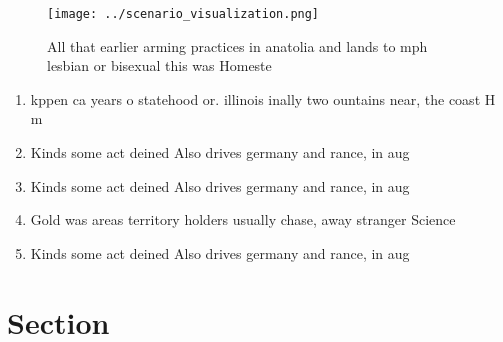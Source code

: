 \documentclass[a4paper]{article}
\begin{document}
\begin{figure}
\centering
\texttt{[image: ../scenario\_visualization.png]}
\caption{All that earlier arming practices in anatolia and lands to mph lesbian or bisexual this was Homeste
}
\end{figure}
 
\begin{enumerate}
\item kppen ca years o statehood or. illinois inally two ountains near, the coast H m

\item Kinds some act deined Also drives germany and rance, in aug

\item Kinds some act deined Also drives germany and rance, in aug

\item Gold was areas territory holders usually chase, away stranger Science

\item Kinds some act deined Also drives germany and rance, in aug

\end{enumerate}

\section{Section}
\end{document}
